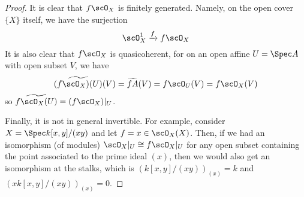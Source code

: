 \begin{proof}
	It is clear that $f\scO_X$ is finitely generated. Namely, on the open cover $\{X\}$ itself, we have the surjection
	\[ \scO_X^1 \xrightarrow{f} f\scO_X \]
	It is also clear that $f\scO_X$ is quasicoherent, for on an open affine $U = \Spec A$ with open subset $V$, we have
	\[ \widetilde{(f\scO_X)(U)}(V) = \widetilde{fA}(V) = f\scO_U(V) = f\scO_X(V) \]
	so $\widetilde{f\scO_X(U)} = (f\scO_X)|_U$.
	
	Finally, it is not in general invertible. For example, consider $X = \Spec k[x,y]/(xy)$ and let $f = x \in \scO_X(X)$. Then, if we had an isomorphism (of modules) $\scO_X|_U \cong f\scO_X|_U$ for any open subset containing the point associated to the prime ideal $(x)$, then we would also get an isomorphism at the stalks, which is $(k[x,y]/(xy))_{(x)} = k$ and $(xk[x,y]/(xy))_{(x)} = 0$.
\end{proof}
